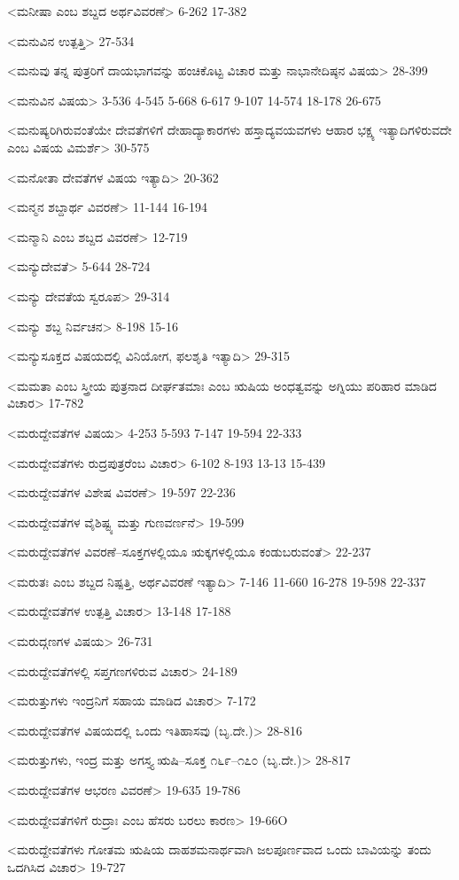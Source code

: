 <ಮನೀಷಾ ಎಂಬ ಶಬ್ದದ ಅರ್ಥವಿವರಣೆ>
6-262
17-382

<ಮನುವಿನ ಉತ್ಪತ್ತಿ>
27-534

<ಮನುವು ತನ್ನ ಪುತ್ರರಿಗೆ ದಾಯಭಾಗವನ್ನು ಹಂಚಿಕೊಟ್ಟ ವಿಚಾರ ಮತ್ತು ನಾಭಾನೇದಿಷ್ಠನ ವಿಷಯ>
28-399

<ಮನುವಿನ ವಿಷಯ>
3-536
4-545 
5-668 
6-617 
9-107
14-574
18-178
26-675

<ಮನುಷ್ಯರಿಗಿರುವಂತೆಯೇ ದೇವತೆಗಳಿಗೆ ದೇಹಾದ್ಯಾಕಾರಗಳು ಹಸ್ತಾದ್ಯವಯವಗಳು ಆಹಾರ ಭಕ್ಷ್ಯ ಇತ್ಯಾದಿಗಳಿರುವದೇ ಎಂಬ ವಿಷಯ ವಿಮರ್ಶೆ>
30-575


<ಮನೋತಾ ದೇವತೆಗಳ ವಿಷಯ ಇತ್ಯಾದಿ>
20-362

<ಮನ್ಮನ ಶಬ್ದಾರ್ಥ ವಿವರಣೆ>
11-144
16-194

<ಮನ್ಮಾನಿ ಎಂಬ ಶಬ್ದದ ವಿವರಣೆ>
12-719

<ಮನ್ಯುದೇವತೆ>
5-644
28-724

<ಮನ್ಯು ದೇವತೆಯ ಸ್ವರೂಪ>
29-314

<ಮನ್ಯು ಶಬ್ದ ನಿರ್ವಚನ>
8-198 
15-16

<ಮನ್ಯುಸೂಕ್ತದ ವಿಷಯದಲ್ಲಿ ವಿನಿಯೋಗ, ಫಲಶೃತಿ ಇತ್ಯಾದಿ>
29-315

<ಮಮತಾ ಎಂಬ ಸ್ತ್ರೀಯ ಪುತ್ರನಾದ ದೀರ್ಘತಮಾಃ ಎಂಬ ಋಷಿಯ ಅಂಧತ್ವವನ್ನು ಅಗ್ನಿಯು ಪರಿಹಾರ ಮಾಡಿದ ವಿಚಾರ>
17-782

<ಮರುದ್ದೇವತೆಗಳ ವಿಷಯ>
4-253
5-593
7-147 
19-594
22-333

<ಮರುದ್ದೇವತೆಗಳು ರುದ್ರಪುತ್ರರೆಂಬ ವಿಚಾರ>
6-102 
8-193
13-13
15-439

<ಮರುದ್ದೇವತೆಗಳ ವಿಶೇಷ ವಿವರಣೆ>
19-597
22-236

<ಮರುದ್ದೇವತೆಗಳ ವೈಶಿಷ್ಟ್ಯ ಮತ್ತು ಗುಣವರ್ಣನೆ>
19-599

<ಮರುದ್ದೇವತೆಗಳ ವಿವರಣೆ–ಸೂಕ್ತಗಳಲ್ಲಿಯೂ ಋಕ್ಕಗಳಲ್ಲಿಯೂ ಕಂಡುಬರುವಂತೆ>
22-237

<ಮರುತಃ ಎಂಬ ಶಬ್ದದ ನಿಷ್ಪತ್ತಿ, ಅರ್ಥವಿವರಣೆ ಇತ್ಯಾದಿ>
7-146 
11-660
16-278
19-598
22-337

<ಮರುದ್ದೇವತೆಗಳ ಉತ್ಪತ್ತಿ ವಿಚಾರ>
13-148
17-188

<ಮರುದ್ಗಣಗಳ ವಿಷಯ>
26-731

<ಮರುದ್ದೇವತೆಗಳಲ್ಲಿ ಸಪ್ತಗಣಗಳಿರುವ ವಿಚಾರ>
24-189

<ಮರುತ್ತುಗಳು ಇಂದ್ರನಿಗೆ ಸಹಾಯ ಮಾಡಿದ ವಿಚಾರ>
7-172

<ಮರುದ್ದೇವತೆಗಳ ವಿಷಯದಲ್ಲಿ ಒಂದು ಇತಿಹಾಸವು (ಬೃ.ದೇ.)>
28-816

<ಮರುತ್ತುಗಳು, ಇಂದ್ರ ಮತ್ತು ಅಗಸ್ತ್ಯ ಋಷಿ–ಸೂಕ್ತ ೧೬೯–೧೭೦ (ಬೃ.ದೇ.)>
28-817

<ಮರುದ್ದೇವತೆಗಳ ಆಭರಣ ವಿವರಣೆ>
19-635 
19-786

<ಮರುದ್ದೇವತೆಗಳಿಗೆ ರುದ್ರಾಃ ಎಂಬ ಹೆಸರು ಬರಲು ಕಾರಣ>
19-66O

<ಮರುದ್ದೇವತೆಗಳು ಗೋತಮ ಋಷಿಯ ದಾಹಶಮನಾರ್ಥವಾಗಿ ಜಲಪೂರ್ಣವಾದ ಒಂದು ಬಾವಿಯನ್ನು ತಂದು ಒದಗಿಸಿದ ವಿಚಾರ>
19-727

